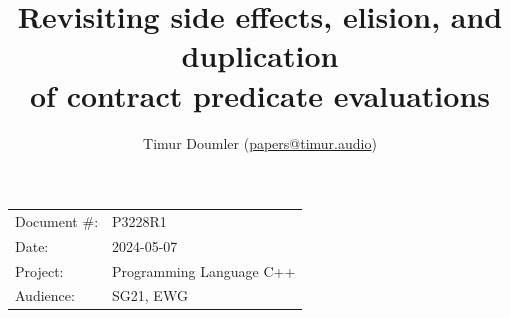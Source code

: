 

 \usepackage[bottom]{footmisc} 

 \usepackage{longtable}


\usepackage{tikz,lipsum,lmodern}
\usepackage[most]{tcolorbox}



\usepackage{titlesec}
\usepackage{tocloft}


\newcommand{\changelocaltocdepth}[1]{%
  \addtocontents{toc}{\protect\setcounter{tocdepth}{#1}}%
  \setcounter{tocdepth}{#1}%
}

\setcounter{tocdepth}{3}



\title{Revisiting side effects, elision, and duplication \\ of contract predicate evaluations}
\author{ Timur Doumler \small(\href{mailto:papers@timur.audio}{papers@timur.audio}) 
}
\date{}
\maketitle

\begin{tabular}{ll}
Document \#: & P3228R1 \\
Date: &2024-05-07 \\
Project: & Programming Language C++ \\
Audience: & SG21, EWG
\end{tabular}

